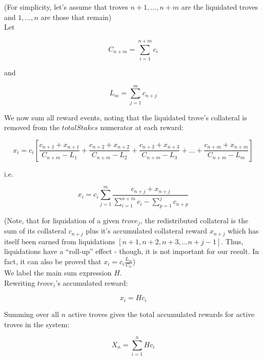 \documentclass[reqno]{article}
\begin{document}
(For simplicity, let’s assume that troves $n+1, ..., n+m$ are the liquidated troves and $1, ..., n$ are those that remain)\\

Let

\begin{equation} 
    C_{n+m}=\sum\limits^{n+m}_{i=1}c_i
\end{equation}

\bigskip
and

\begin{equation} 
    L_m=\sum\limits^m_{j=1}c_{n+j}
\end{equation}

\bigskip
We now sum all reward events, noting that the liquidated trove’s collateral is removed from the $totalStakes$ numerator at each reward:

\begin{equation} 
    x_i=c_i\left[\frac{c_{n+1}+x_{n+1}}{C_{n+m}-L_1}+\frac{c_{n+2}+x_{n+2}}{C_{n+m}-L_2}+\frac{c_{n+3}+x_{n+3}}{C_{n+m}-L_3}+...+\frac{c_{n+m}+x_{n+m}}{C_{n+m}-L_m}\right]
\end{equation}

\bigskip
i.e.

\begin{equation} 
    x_i=c_i\sum\limits^m_{j=1}\frac{c_{n+j}+x_{n+j}}{\sum\limits^{n+m}_{i=1}c_i-\sum\limits^j_{p=1}c_{n+p}}
\end{equation}

\bigskip
(Note, that for liquidation of a given $trove_j$, the redistributed collateral is the sum of its collateral $c_{n+j}$ plus it’s accumulated collateral reward $x_{n+j}$ which has itself been earned from liquidations $[n+1, n+2, n+3, … n+j-1]$.  Thus, liquidations have a “roll-up” effect - though, it is not important for our result. In fact, it can also be proved that $x_i=c_i\frac{L_m}{C_n}$)\\

We label the main sum expression $H$.\\

Rewriting $trove_i$’s accumulated reward:

\begin{equation} \label{eq:45}
    x_i=Hc_i
\end{equation}

\bigskip
Summing over all $n$ active troves gives the total accumulated rewards for active troves in the system:

\begin{equation} 
    X_n=\sum\limits^n_{i=1}Hc_i
\end{equation}
\end{document}

